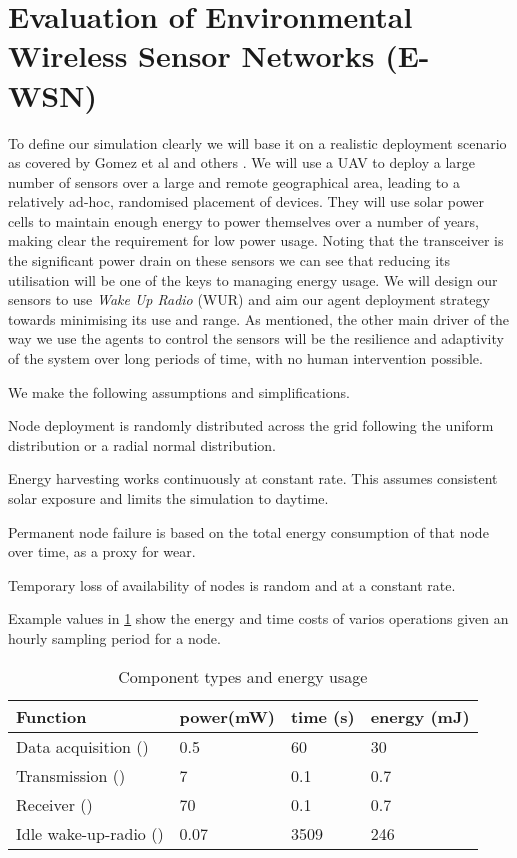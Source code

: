 \section{Evaluation of Environmental Wireless Sensor Networks (E-WSN)}
\label{section:experimental}	

To define our simulation clearly we will base it on a realistic deployment scenario as covered by Gomez et al \cite{Gomez} and others \cite{Jha2016, Avram}. We will use a UAV to deploy a large number of sensors over a large and remote geographical area, leading to a relatively ad-hoc, randomised placement of devices. They will use solar power cells to maintain enough energy to power themselves over a number of years, making clear the requirement for low power usage. Noting that the transceiver is the significant power drain on these sensors we can see that reducing its utilisation will be one of the keys to managing energy usage. We will design our sensors to use \textit{Wake Up Radio} (WUR) and aim our agent deployment strategy towards minimising its use and range. As mentioned, the other main driver of the way we use the agents to control the sensors will be the resilience and adaptivity of the system over long periods of time, with no human intervention possible. 

We make the following assumptions and simplifications.
\begin{itemize}{
		\item Node deployment is randomly distributed across the grid following the uniform distribution or a radial normal distribution.
		\item Energy harvesting works continuously at constant rate. This assumes consistent solar exposure and limits the simulation to daytime.
		\item Permanent node failure is based on the total energy consumption of that node over time, as a proxy for wear.
		\item Temporary loss of availability of nodes is random and at a constant rate.
	}
\end{itemize}

Example values in \ref{table:components_energy_usage} show the energy and time costs of varios operations given an hourly sampling period for a node.


\begin{table}[h]
	\begin{tabular}{p{}p{} p{} p{}}
		\hline
		Function & power(mW) & time (s) & energy (mJ)\\
		\hline
		Data acquisition (\symbolDataAcquisition{}{}) & 0.5 & 60 & 30 \\
		Transmission (\symbolTransmission{}{}) & 7 & 0.1 & 0.7 \\
		Receiver (\symbolReceiver{}{}) & 70 & 0.1 & 0.7 \\
		Idle wake-up-radio (\symbolWakeUpRadio{}{}) & 0.07 & 3509 & 246  \\
	\end{tabular}
	\caption{Component types and energy usage}
	\label{table:components_energy_usage}
\end{table}

